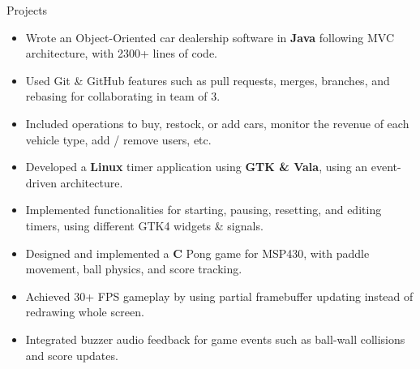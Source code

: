 \documentclass{resume} %
\begin{document}
\begin{workSection}{Projects}
	
	\customItem[
		title=CLI Car Dealership,
		duration=April 2024,
	]
	\begin{itemize}
		\vspace{-0.5em}
		\itemsep -6pt {}
		\item Wrote an Object-Oriented car dealership software in \textbf{Java} following MVC architecture, with 2300+ lines of code.
		\item Used Git \& GitHub features such as pull requests, merges, branches, and rebasing for collaborating in team of 3.
		\item Included operations to buy{,} restock{,} or add cars{,} monitor the revenue of each vehicle type{,} add / remove users, etc.
	\end{itemize}
	
	\customItem[
		title=\href{https://github.com/AshkanArabim/gtk-timer}{Linux Timer \faExternalLink},
		duration=January 2024,
	]
	\begin{itemize}
		\vspace{-0.5em}
		\itemsep -6pt {}
		\item Developed a \textbf{Linux} timer application using \textbf{GTK \& Vala}, using an event-driven architecture.
		\item Implemented functionalities for starting, pausing, resetting, and editing timers, using different GTK4 widgets \& signals.
	\end{itemize}
	
	\customItem[
		title=\href{https://github.com/AshkanArabim/pong-msp430}{Pong for MSP430 \faExternalLink},
		duration=November 2023,
	]
	\begin{itemize}
		\vspace{-0.5em}
		\itemsep -6pt {}
		\item Designed and implemented a \textbf{C} Pong game for MSP430, with paddle movement, ball physics, and score tracking.
		\item Achieved 30+ FPS gameplay by using partial framebuffer updating instead of redrawing whole screen.
		\item Integrated buzzer audio feedback for game events such as ball-wall collisions and score updates.
	\end{itemize}
	

\end{workSection}
\end{document}
